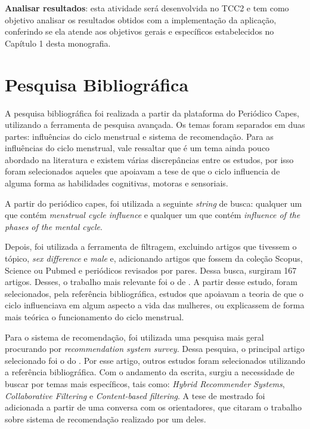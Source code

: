 \textbf{Analisar resultados}: esta atividade será desenvolvida no TCC2 e tem como objetivo 
analisar os resultados obtidos com a implementação da aplicação, conferindo se ela atende 
aos objetivos gerais e específicos estabelecidos no Capítulo 1 desta monografia.

\section{Pesquisa Bibliográfica}

A pesquisa bibliográfica foi realizada a partir da plataforma do Periódico Capes, utilizando a ferramenta de pesquisa avançada.
Os temas foram separados em duas partes: influências do ciclo menstrual e sistema de recomendação.
Para as influências do ciclo menstrual, vale ressaltar que é um tema ainda pouco abordado na literatura e existem 
várias discrepâncias entre os estudos, por isso foram selecionados aqueles que apoiavam a tese de que 
o ciclo influencia de alguma forma as habilidades cognitivas, motoras e sensoriais. 




A partir do periódico capes, foi utilizada a seguinte \emph{string} de busca:
qualquer um que contém \emph{menstrual cycle influence} e qualquer um que contém 
\emph{influence of the phases of the mental cycle}. 

Depois, foi utilizada a ferramenta de filtragem, excluindo artigos que tivessem o tópico, \emph{sex difference} e \emph{male}
 e, adicionando artigos que fossem da coleção Scopus, Science ou Pubmed e periódicos revisados por pares. Dessa busca, surgiram 167 artigos.
Desses, o trabalho mais relevante foi o de . A partir desse estudo, foram selecionados, pela referência bibliográfica, estudos que apoiavam 
a teoria de que o ciclo influenciava em algum aspecto a vida das mulheres, ou explicassem de forma mais teórica o funcionamento do ciclo menstrual.


Para o sistema de recomendação, foi utilizada uma pesquisa mais geral procurando por \emph{recommendation system survey}. Dessa pesquisa, o principal artigo selecionado foi o 
do . Por esse artigo, outros estudos foram selecionados utilizando a referência bibliográfica. Com o andamento da escrita, surgiu a necessidade de buscar
por temas mais específicos, tais como: \emph{Hybrid Recommender Systems}, \emph{Collaborative Filtering} e \emph{Content-based filtering}. A tese de mestrado \cite{mauricio} foi adicionada a partir 
de uma conversa com os orientadores, que citaram o trabalho sobre sistema de recomendação realizado por um deles.


